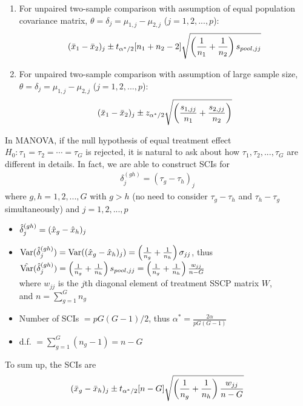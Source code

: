 \documentclass[12pt]{extarticle}
\newcommand{\<}{\langle}
\renewcommand{\>}{\rangle}
\theoremstyle{definition}
\begin{document}
\begin{tcolorbox}[enhanced, drop fuzzy shadow, title=Generalization of SCIs]
\begin{enumerate}
    \item For unpaired two-sample comparison with assumption of equal population covariance matrix, $\theta =\delta_j =\mu_{1,j}-\mu_{2,j}$ ($j=1,2,...,p$):
    \begin{align*}
        (\Bar{x}_1 -\Bar{x}_2)_j \pm t_{\alpha^* /2}[n_1 +n_2 -2]\sqrt{\left(\frac{1}{n_1}+ \frac{1}{n_2}\right)s_{pool,jj}}
    \end{align*}
    \item For unpaired two-sample comparison with assumption of large sample size, $\theta =\delta_j =\mu_{1,j}-\mu_{2,j}$ ($j=1,2,...,p$):
    \begin{align*}
        (\Bar{x}_1 -\Bar{x}_2)_j \pm z_{\alpha^* /2} \sqrt{\left(\frac{s_{1,jj}}{n_1}+ \frac{s_{2,jj}}{n_2}\right)}
    \end{align*}
\end{enumerate}
\end{tcolorbox}

\begin{tcolorbox}[enhanced, drop fuzzy shadow, title=SCIs for treatment effects in MANOVA]
In MANOVA, if the null hypothesis of equal treatment effect $H_0: \tau_1 =\tau_2 = \cdots =\tau_G$ is rejected, it is natural to ask about how $\tau_1,\tau_2,...,\tau_G$ are different in details. In fact, we are able to construct SCIs for
\begin{align*}
    \delta_j^{(gh)} = (\tau_g -\tau_h)_j
\end{align*}
where $g,h=1,2,...,G$ with $g>h$ (no need to consider $\tau_g -\tau_h$ and $\tau_h -\tau_g$ simultaneously) and $j=1,2,...,p$
\begin{itemize}
    \item $\Hat{\delta}_j^{(gh)} =(\Hat{x}_g -\Hat{x}_h)_j$
    \item $\text{Var}(\Hat{\delta}_j^{(gh)}) =\text{Var}((\Hat{x}_g -\Hat{x}_h)_j) = \left(\frac{1}{n_g} +\frac{1}{n_h}\right)\sigma_{jj}$, thus\\
    $\Hat{\text{Var}}(\Hat{\delta}_j^{(gh)}) = \left(\frac{1}{n_g} +\frac{1}{n_h}\right)s_{pool,jj} = \left(\frac{1}{n_g} +\frac{1}{n_h}\right)\frac{w_{jj}}{n-G}$\\
    where $w_{jj}$ is the $j$th diagonal element of treatment SSCP matrix $W$,\\
    and $n=\sum^G_{g=1}n_g$
    \item Number of SCIs $=pG(G-1)/2$, thus $\alpha^* =\frac{2\alpha}{pG(G-1)}$
    \item d.f. $=\sum^G_{g=1}(n_g -1) =n-G$
\end{itemize}
To sum up, the SCIs are
\begin{align*}
    (\Bar{x}_g -\Bar{x}_h)_j \pm t_{\alpha^* /2}[n-G]\sqrt{\left(\frac{1}{n_g}+ \frac{1}{n_h}\right)\frac{w_{jj}}{n-G}}
\end{align*}
\end{tcolorbox}
\end{document}
